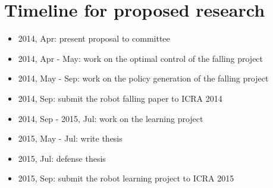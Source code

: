 \chapter{Timeline for proposed research}

\begin{itemize}
  \item 2014, Apr: present proposal to committee
  \item 2014, Apr - May: work on the optimal control of the falling project
  \item 2014, May - Sep: work on the policy generation of the falling project
  \item 2014, Sep: submit the robot falling paper to ICRA 2014
  \item 2014, Sep - 2015, Jul: work on the learning project
  \item 2015, May - Jul: write thesis
  \item 2015, Jul: defense thesis
  \item 2015, Sep: submit the robot learning project to ICRA 2015
\end{itemize}
